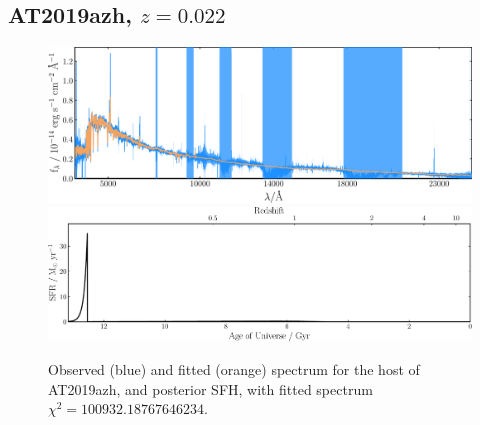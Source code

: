 \documentclass[a4paper,12pt]{article}
\begin{document}

\newpage
\subsection{AT2019azh, $z=0.022$}\label{sec:AT2019azh}
\begin{figure}[h]
  \centering
  \includegraphics[width=\textwidth]{AT2019azh_spec}
  \includegraphics[width=\textwidth]{AT2019azh_sfh}
  \caption{
  Observed (blue) and fitted (orange) spectrum for the host of AT2019azh, and
  posterior SFH, with fitted spectrum $\chi^2=100932.18767646234$.
  }
  \label{fig:AT2019azh_sfh}
\end{figure}
\end{document}
